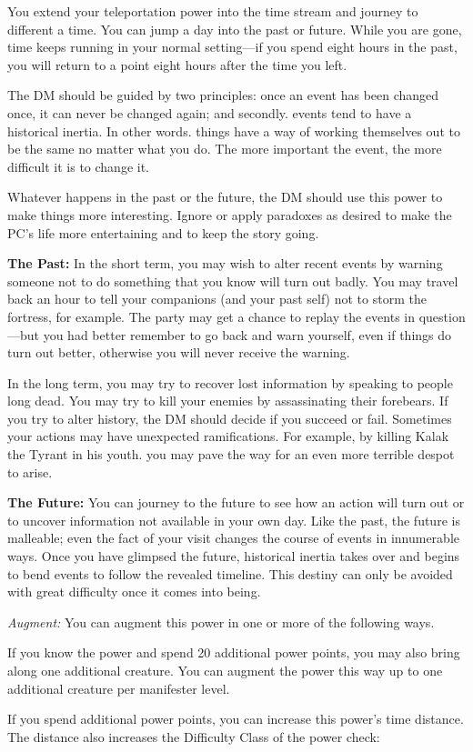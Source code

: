 {
	You extend your teleportation power into the time stream and journey to different a time. You can jump a day into the past or future. While you are gone, time keeps running in your normal setting---if you spend eight hours in the past, you will return to a point eight hours after the time you left.

	The DM should be guided by two principles: once an event has been changed once, it can never be changed again; and secondly. events tend to have a historical inertia. In other words. things have a way of working themselves out to be the same no matter what you do. The more important the event, the more difficult it is to change it.

	Whatever happens in the past or the future, the DM should use this power to make things more interesting. Ignore or apply paradoxes as desired to make the PC's life more entertaining and to keep the story going.

	\textbf{The Past:} In the short term, you may wish to alter recent events by warning someone not to do something that you know will turn out badly. You may travel back an hour to tell your companions (and your past self) not to storm the fortress, for example. The party may get a chance to replay the events in question---but you had better remember to go back and warn yourself, even if things do turn out better, otherwise you will never receive the warning.

	In the long term, you may try to recover lost information by speaking to people long dead. You may try to kill your enemies by assassinating their forebears. If you try to alter history, the DM should decide if you succeed or fail. Sometimes your actions may have unexpected ramifications. For example, by killing Kalak the Tyrant in his youth. you may pave the way for an even more terrible despot to arise.

	\textbf{The Future:} You can journey to the future to see how an action will turn out or to uncover information not available in your own day. Like the past, the future is malleable; even the fact of your visit changes the course of events in innumerable ways. Once you have glimpsed the future, historical inertia takes over and begins to bend events to follow the revealed timeline. This destiny can only be avoided with great difficulty once it comes into being.

	\textit{Augment:} You can augment this power in one or more of the following ways.
	\begin{enumerate*}
	\item If you know the  power and spend 20 additional power points, you may also bring along one additional creature. You can augment the power this way up to one additional creature per manifester level.
	\item If you spend additional power points, you can increase this power's time distance. The distance also increases the Difficulty Class of the power check: 
	\end{enumerate*}

}
